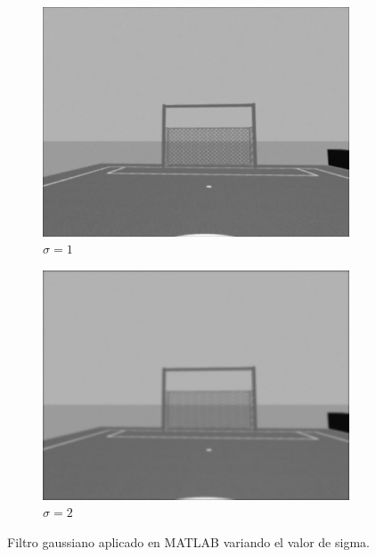 \begin{figure}[H]
\begin{subfigure}[b]{0.41\linewidth}
		\includegraphics[width=\linewidth]{images/1-5.jpg}
		\caption{$\sigma=1$}
	\end{subfigure}
	\begin{subfigure}[b]{0.41\linewidth}
		\includegraphics[width=\linewidth]{images/2-13.jpg}
		\caption{ $\sigma=2$}
	\end{subfigure}
	\caption{Filtro gaussiano aplicado en MATLAB variando el valor de sigma.}
	\vspace{1cm}
	\begin{minipage}[b]{0.5\linewidth}

\end{minipage}
\end{figure}
